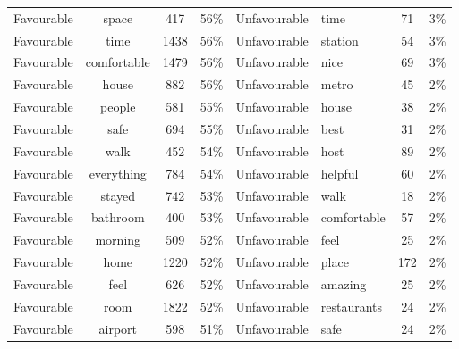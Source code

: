 \documentclass[a4paper, 12pt]{article}
\begin{document}
\begin{table}[htbp]
\begin{tabular}{ccccp{5.715em}p{4.715em}cc}
    \multicolumn{1}{p{4.715em}}{Favourable} & \multicolumn{1}{p{4.715em}}{space} & 417   & 56\%  & Unfavourable & time  & 71    & 3\% \\
    \multicolumn{1}{p{4.715em}}{Favourable} & \multicolumn{1}{p{4.715em}}{time} & 1438  & 56\%  & Unfavourable & station & 54    & 3\% \\
    \multicolumn{1}{p{4.715em}}{Favourable} & \multicolumn{1}{p{4.715em}}{comfortable} & 1479  & 56\%  & Unfavourable & nice  & 69    & 3\% \\
    \multicolumn{1}{p{4.715em}}{Favourable} & \multicolumn{1}{p{4.715em}}{house} & 882   & 56\%  & Unfavourable & metro & 45    & 2\% \\
    \multicolumn{1}{p{4.715em}}{Favourable} & \multicolumn{1}{p{4.715em}}{people} & 581   & 55\%  & Unfavourable & house & 38    & 2\% \\
    \multicolumn{1}{p{4.715em}}{Favourable} & \multicolumn{1}{p{4.715em}}{safe} & 694   & 55\%  & Unfavourable & best  & 31    & 2\% \\
    \multicolumn{1}{p{4.715em}}{Favourable} & \multicolumn{1}{p{4.715em}}{walk} & 452   & 54\%  & Unfavourable & host  & 89    & 2\% \\
    \multicolumn{1}{p{4.715em}}{Favourable} & \multicolumn{1}{p{4.715em}}{everything} & 784   & 54\%  & Unfavourable & helpful & 60    & 2\% \\
    \multicolumn{1}{p{4.715em}}{Favourable} & \multicolumn{1}{p{4.715em}}{stayed} & 742   & 53\%  & Unfavourable & walk  & 18    & 2\% \\
    \multicolumn{1}{p{4.715em}}{Favourable} & \multicolumn{1}{p{4.715em}}{bathroom} & 400   & 53\%  & Unfavourable & comfortable & 57    & 2\% \\
    \multicolumn{1}{p{4.715em}}{Favourable} & \multicolumn{1}{p{4.715em}}{morning} & 509   & 52\%  & Unfavourable & feel  & 25    & 2\% \\
    \multicolumn{1}{p{4.715em}}{Favourable} & \multicolumn{1}{p{4.715em}}{home} & 1220  & 52\%  & Unfavourable & place & 172   & 2\% \\
    \multicolumn{1}{p{4.715em}}{Favourable} & \multicolumn{1}{p{4.715em}}{feel} & 626   & 52\%  & Unfavourable & amazing & 25    & 2\% \\
    \multicolumn{1}{p{4.715em}}{Favourable} & \multicolumn{1}{p{4.715em}}{room} & 1822  & 52\%  & Unfavourable & restaurants & 24    & 2\% \\
    \multicolumn{1}{p{4.715em}}{Favourable} & \multicolumn{1}{p{4.715em}}{airport} & 598   & 51\%  & Unfavourable & safe  & 24    & 2\% \\

\end{tabular}
\end{table}
\end{document}
